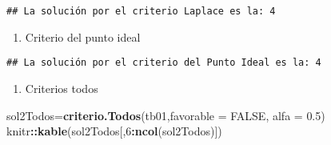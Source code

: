 \documentclass[
]{article}
\newenvironment{Shaded}{\begin{snugshade}}{\end{snugshade}}
\newcommand{\AttributeTok}[1]{\textcolor[rgb]{0.13,0.29,0.53}{#1}}
\newcommand{\ConstantTok}[1]{\textcolor[rgb]{0.56,0.35,0.01}{#1}}
\newcommand{\DecValTok}[1]{\textcolor[rgb]{0.00,0.00,0.81}{#1}}
\newcommand{\FloatTok}[1]{\textcolor[rgb]{0.00,0.00,0.81}{#1}}
\newcommand{\FunctionTok}[1]{\textcolor[rgb]{0.13,0.29,0.53}{\textbf{#1}}}
\newcommand{\NormalTok}[1]{#1}
\newcommand{\OtherTok}[1]{\textcolor[rgb]{0.56,0.35,0.01}{#1}}
\newcommand{\SpecialCharTok}[1]{\textcolor[rgb]{0.81,0.36,0.00}{\textbf{#1}}}
\newcommand{\StringTok}[1]{\textcolor[rgb]{0.31,0.60,0.02}{#1}}
\providecommand{\tightlist}{%
  \setlength{\itemsep}{0pt}\setlength{\parskip}{0pt}}
\begin{document}
\begin{verbatim}
## La solución por el criterio Laplace es la: 4
\end{verbatim}

\begin{enumerate}
\def\labelenumi{\arabic{enumi}.}
\setcounter{enumi}{5}
\tightlist
\item
  Criterio del punto ideal
\end{enumerate}

\begin{Shaded}
\end{Shaded}

\begin{verbatim}
## La solución por el criterio del Punto Ideal es la: 4
\end{verbatim}

\begin{enumerate}
\def\labelenumi{\arabic{enumi}.}
\setcounter{enumi}{6}
\tightlist
\item
  Criterios todos
\end{enumerate}

\begin{Shaded}
\begin{Highlighting}[]
\NormalTok{sol2Todos}\OtherTok{=}\FunctionTok{criterio.Todos}\NormalTok{(tb01,}\AttributeTok{favorable =} \ConstantTok{FALSE}\NormalTok{, }\AttributeTok{alfa =} \FloatTok{0.5}\NormalTok{)}
\NormalTok{knitr}\SpecialCharTok{::}\FunctionTok{kable}\NormalTok{(sol2Todos[,}\DecValTok{6}\SpecialCharTok{:}\FunctionTok{ncol}\NormalTok{(sol2Todos)])}
\end{Highlighting}
\end{Shaded}
\end{document}
